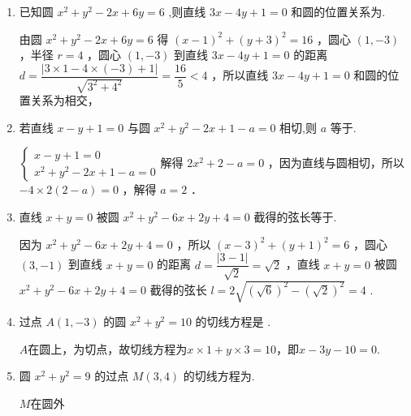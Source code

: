 \begin{enumerate}

    \item 已知圆 ${x}^{2} + {y}^{2} - {2x} + {6y} = 6$ ,则直线 ${3x} - {4y} + 1 = 0$ 和圆的位置关系为.
    \begin{jieda}
        由圆 $x^2+y^2-2 x+6 y=6$ 得 $(x-1)^2+(y+3)^2=16$ ，圆心 $(1,-3)$ ，半径 $r=4$ ，圆心 $(1,-3)$ 到直线 $3 x-4 y+1=0$ 的距离 $d=\dfrac{|3 \times 1-4 \times(-3)+1|}{\sqrt{3^2+4^2}}=\dfrac{16}{5}<4$ ，所以直线 $3 x-4 y+1=0$ 和圆的位置关系为相交，
    \end{jieda}

    \item 若直线 $x - y + 1 = 0$ 与圆 ${x}^{2} + {y}^{2} - {2x} + 1 - a = 0$ 相切,则 $a$ 等于.
    \begin{jieda}
$\left\{\begin{array}{l}
x-y+1=0 \\
x^2+y^2-2 x+1-a=0
\end{array}\right.
$解得 $2 x^2+2-a=0$ ，因为直线与圆相切，所以 $-4 \times 2(2-a)=0$ ，解得 $a=2$ ．
    \end{jieda}

    \item 直线 ${x} + {y} = 0$ 被圆 ${x}^2 + {y}^2 - 6{x} + 2{y} + 4 = 0$ 截得的弦长等于.
    \begin{jieda}
        因为 $x^2+y^2-6 x+2 y+4=0$ ，所以 $(x-3)^2+(y+1)^2=6$ ，圆心 $(3,-1)$ 到直线 $x+y=0$ 的距离 $d=\dfrac{|3-1|}{\sqrt{2}}=\sqrt{2}$ ，直线 $x+y=0$ 被圆 $x^2+y^2-6 x+2 y+4=0$ 截得的弦长 $l =2 \sqrt{(\sqrt{6})^2-(\sqrt{2})^2}=4$ .
    \end{jieda}

    \item 过点 $A\left( {1, - 3}\right)$ 的圆 ${x}^{2} + {y}^{2} = {10}$ 的切线方程是 .
    \begin{jieda}
        $A$在圆上，为切点，故切线方程为$x\times1+y\times3 = 10$，即$x-3y-10=0$.
    \end{jieda}

    \item 圆 ${x}^{2} + {y}^{2} = 9$ 的过点 $M\left( {3,4}\right)$ 的切线方程为.
    \begin{jieda}
        $M$在圆外
    \end{jieda}

\end{enumerate}

